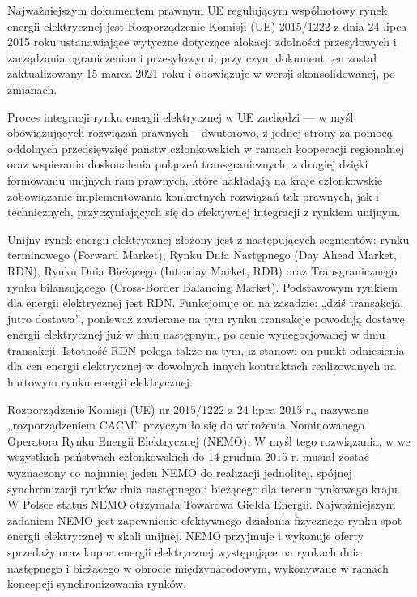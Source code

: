 \documentclass[polish, twoside, 12pt, a4paper]{article}
\theoremstyle{definition}
\theoremstyle{plain}
\theoremstyle{remark}
\begin{document}
Najważniejszym dokumentem prawnym UE regulującym wspólnotowy rynek energii elektrycznej jest Rozporządzenie Komisji (UE) 2015/1222 z dnia 24 lipca 2015 roku \citep{ec2015} ustanawiające wytyczne dotyczące alokacji zdolności przesyłowych i zarządzania ograniczeniami przesyłowymi, przy czym dokument ten został zaktualizowany 15 marca 2021 roku i obowiązuje w wersji skonsolidowanej, po zmianach. 

Proces integracji rynku energii elektrycznej w UE zachodzi --- w myśl obowiązujących rozwiązań prawnych – dwutorowo, z jednej strony za pomocą oddolnych przedsięwzięć państw członkowskich w ramach kooperacji regionalnej oraz wspierania doskonalenia połączeń transgranicznych, z drugiej dzięki formowaniu unijnych ram prawnych, które nakładają na kraje członkowskie zobowiązanie implementowania konkretnych rozwiązań tak prawnych, jak i technicznych, przyczyniających się do efektywnej integracji z rynkiem unijnym. 

Unijny rynek energii elektrycznej złożony jest z następujących segmentów: rynku terminowego (Forward Market), Rynku Dnia Następnego (Day Ahead Market, RDN), Rynku Dnia Bieżącego (Intraday Market, RDB) oraz Transgranicznego rynku bilansującego (Cross-Border Balancing Market). Podstawowym rynkiem dla energii elektrycznej jest RDN. Funkcjonuje on na zasadzie: „dziś transakcja, jutro dostawa”, ponieważ zawierane na tym rynku transakcje powodują dostawę energii elektrycznej już w dniu następnym, po cenie wynegocjowanej w dniu transakcji. Istotność RDN polega także na tym, iż stanowi on punkt odniesienia dla cen energii elektrycznej w dowolnych innych kontraktach realizowanych na hurtowym rynku energii elektrycznej.

Rozporządzenie Komisji (UE) nr 2015/1222 z 24 lipca 2015 r., nazywane „rozporządzeniem CACM” \citep{ec2015} przyczyniło się do wdrożenia Nominowanego Operatora Rynku Energii Elektrycznej (NEMO). W myśl tego rozwiązania, w we wszystkich państwach członkowskich do 14 grudnia 2015 r. musiał zostać wyznaczony co najmniej jeden NEMO do realizacji jednolitej, spójnej synchronizacji rynków dnia następnego i bieżącego dla terenu rynkowego kraju. W Polsce status NEMO otrzymała Towarowa Giełda Energii. Najważniejszym zadaniem NEMO jest zapewnienie efektywnego działania fizycznego rynku spot energii elektrycznej w skali unijnej. NEMO przyjmuje i wykonuje oferty sprzedaży oraz kupna energii elektrycznej występujące na rynkach dnia następnego i bieżącego w obrocie międzynarodowym, wykonywane w ramach koncepcji synchronizowania rynków. 
\end{document}
